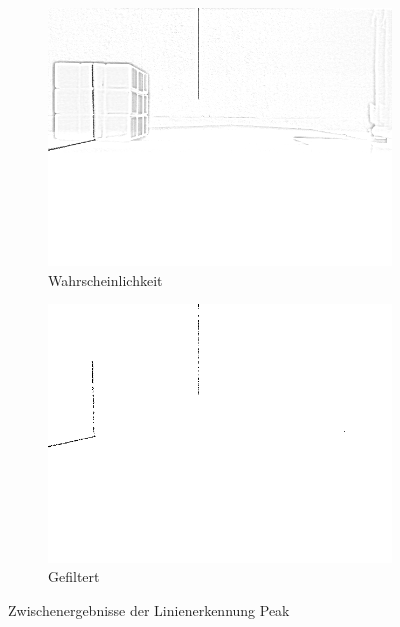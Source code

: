\documentclass[ngerman,a4paper,parskip=half]{scrartcl}
\begin{document}
\begin{figure}[H]
	\begin{subfigure}{0.45\textwidth}
		\includegraphics[width=\textwidth,frame]{includes/line_peak_eval.png}
		\caption{Wahrscheinlichkeit}
	\end{subfigure}
	\hfill
	\begin{subfigure}{0.45\textwidth}
		\includegraphics[width=\textwidth,frame]{includes/line_peak_filtered.png}
		\caption{Gefiltert}
	\end{subfigure}

	\caption{Zwischenergebnisse der Linienerkennung Peak}
	\label{fig:peak}
\end{figure}
\end{document}
